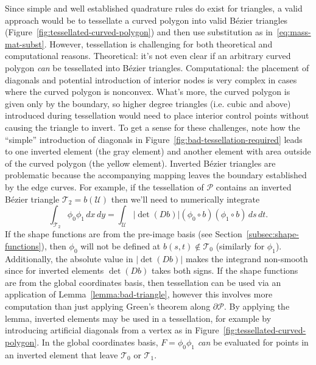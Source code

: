 \documentclass[letterpaper,10pt]{article}
\theoremstyle{definition}
\newcommand{\utri}{\mathcal{U}}
\begin{document}
Since simple and well established quadrature rules do exist for triangles,
a valid approach would be
to tessellate a curved polygon into valid B\'{e}zier triangles
(Figure~\ref{fig:tessellated-curved-polygon}) and then use substitution as
in~\eqref{eq:mass-mat-subst}. However, tessellation is challenging for both
theoretical and computational reasons.
Theoretical: it's not even clear if an arbitrary curved polygon \emph{can}
be tessellated into B\'{e}zier triangles. Computational: the placement
of diagonals and potential introduction of interior nodes is very
complex in cases where the curved polygon is nonconvex. What's more,
the curved polygon is given only by the boundary, so higher degree triangles
(i.e. cubic and above) introduced during tessellation would need to place
interior control points without causing the triangle to invert. To get a
sense for these challenges, note how the ``simple'' introduction of
diagonals in Figure~\ref{fig:bad-tessellation-required} leads to one
inverted element (the gray element) and another element with area outside
of the curved polygon (the yellow element). Inverted B\'{e}zier triangles
are problematic because the accompanying mapping leaves the boundary
established by the edge curves. For example,
if the tessellation of \(\mathcal{P}\) contains an inverted
B\'{e}zier triangle \(\mathcal{T}_2 = b\left(\utri\right)\) then we'll
need to numerically integrate
\begin{equation}
\int_{\mathcal{T}_2} \phi_0 \phi_1 \, dx \, dy =
  \int_{\utri} \left|\det(Db)\right| \left(\phi_0 \circ b\right)
  \left(\phi_1 \circ b\right) \, ds \, dt.
\end{equation}
If the shape functions are from the pre-image basis (see
Section~\ref{subsec:shape-functions}), then \(\phi_0\)
will not be defined at \(b(s, t) \not\in \mathcal{T}_0\) (similarly for
\(\phi_1\)). Additionally, the absolute value in \(\left|\det(Db)\right|\)
makes the integrand non-smooth since for inverted elements
\(\det(Db)\) takes both signs. If the shape functions are from the
global coordinates basis, then tessellation can be used via an
application of Lemma~\ref{lemma:bad-triangle}, however this involves
more computation than just applying Green's theorem along
\(\partial \mathcal{P}\). By applying the lemma, inverted elements may
be used in a tessellation, for example by introducing artificial
diagonals from a vertex as in Figure~\ref{fig:tessellated-curved-polygon}.
In the global coordinates basis, \(F = \phi_0 \phi_1\) \emph{can}
be evaluated for points in an inverted element that leave
\(\mathcal{T}_0\) or \(\mathcal{T}_1\).
\end{document}
